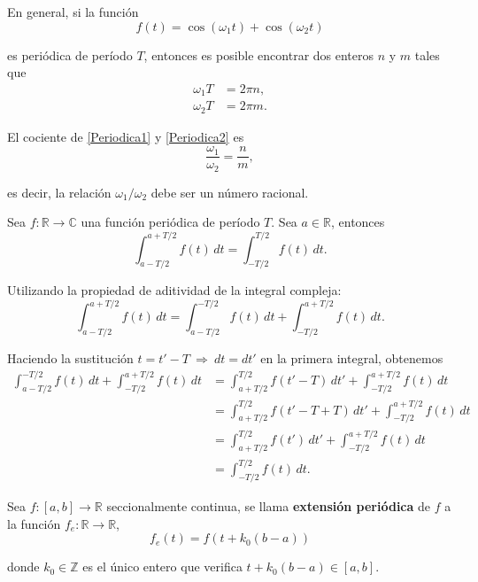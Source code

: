 En general, si la función 
$$f(t) = \cos (\omega_1 t) + \cos (\omega_2 t)$$

es periódica de período $T$, entonces es posible encontrar dos enteros $n$ y $m$ tales que 
\begin{align}
    \omega_1 T &= 2\pi n,  \label{Periodica1}\\
     \omega_2 T &= 2\pi m. \label{Periodica2}
\end{align}

El cociente de \eqref{Periodica1} y \eqref{Periodica2} es
$$\frac{\omega_1}{\omega_2} = \frac{n}{m},$$

es decir, la relación $\omega_1/ \omega_2$ debe ser un número racional.

\begin{propo}
Sea $f: \mathbb{R} \longrightarrow \mathbb{C}$ una función periódica de período $T$. Sea $a \in \mathbb{R}$, entonces
$$ \int_{a-T/2}^{a + T/2} f(t) \,dt = \int_{- T/2}^{T/2} f(t) \,dt .$$
\end{propo}

\begin{demo}
Utilizando la propiedad de aditividad de la integral compleja:
\begin{equation*}
    \int_{a-T/2}^{a + T/2} f(t) \,dt = \int_{a - T/2}^{-T/2} f(t) \,dt + \int_{- T/2}^{a + T/2} f(t) \,dt.
\end{equation*}

Haciendo la sustitución  $t = t' - T ~\Rightarrow~ dt = dt'$ en la primera integral, obtenemos
\begin{align*}
   \int_{a - T/2}^{-T/2}f(t) \,dt + \int_{- T/2}^{a + T/2} f(t) \,dt   &= \int_{a + T/2}^{T/2} f(t'-T) \,dt' + \int_{- T/2}^{a + T/2} f(t) \,dt \\
   &= \int_{a + T/2}^{T/2} f(t'-T + T) \,dt' + \int_{- T/2}^{a + T/2} f(t) \,dt \\
   &= \int_{a + T/2}^{T/2} f(t') \,dt' + \int_{-T/2}^{a + T/2} f(t) \,dt \\
   &= \int_{-T/2}^{T/2} f(t) \,dt.
\end{align*}
\end{demo}

\begin{defi}
Sea $f: [a,b] \rightarrow \mathbb{R}$ seccionalmente continua, se llama \textbf{extensión periódica} de $f$ a la función $f_e: \mathbb{R} \rightarrow \mathbb{R}$,
$$f_e(t) = f(t + k_0 (b-a))$$

donde $k_0 \in \mathbb{Z}$ es el único entero que verifica $t + k_0(b-a) \in [a,b].$
\end{defi}


